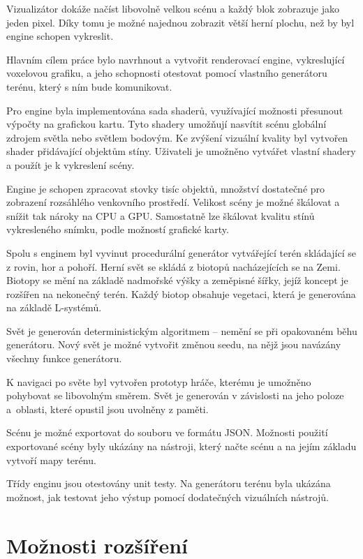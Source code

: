 \documentclass[thesis=M,czech]{FITthesis}[2019/12/23]
\begin{document}
Vizualizátor dokáže načíst libovolně velkou scénu a každý blok zobrazuje jako jeden pixel. Díky tomu je možné najednou zobrazit větší herní plochu, než by byl engine schopen vykreslit.



\begin{conclusion}
Hlavním cílem práce bylo navrhnout a vytvořit renderovací engine, vykreslující voxelovou grafiku, a jeho schopnosti otestovat pomocí vlastního generátoru terénu, který s ním bude komunikovat.

Pro engine byla implementována sada shaderů, využívající možnosti pře\-su\-nout výpočty na grafickou kartu. Tyto shadery umožňují nasvítit scénu globální zdrojem světla nebo světlem bodovým. Ke zvýšení vizuální kvality byl vytvořen shader přidávající objektům stíny. Uživateli je umožněno vytvářet vlastní shadery a použít je k vykreslení scény.

Engine je schopen zpracovat stovky tisíc objektů, množství dostatečné pro zobrazení rozsáhlého venkovního prostředí. Velikost scény je možné škálovat a snížit tak nároky na CPU a GPU. Samostatně lze škálovat kvalitu stínů vykresleného snímku, podle možností grafické karty.

Spolu s enginem byl vyvinut procedurální generátor vytvářející terén sklá\-da\-jí\-cí se z rovin, hor a pohoří. Herní svět se skládá z biotopů nacházejících se na Zemi. Biotopy se mění na základě nadmořské výšky a zeměpisné šířky, jejíž koncept je rozšířen na nekonečný terén. Každý biotop obsahuje vegetaci, která je generována na základě L-systémů.

Svět je generován deterministickým algoritmem -- nemění se při opakovaném běhu generátoru. Nový svět je možné vytvořit změnou seedu, na nějž jsou navázány všechny funkce generátoru.

K navigaci po světe byl vytvořen prototyp hráče, kterému je umožněno pohybovat se libovolným směrem. Svět je generován v závislosti na jeho poloze a~oblasti, které opustil jsou uvolněny z paměti. 

Scénu je možné exportovat do souboru ve formátu JSON. Možnosti použití exportované scény byly ukázány na nástroji, který načte scénu a na jejím základu vytvoří mapy terénu.

Třídy enginu jsou otestovány unit testy. Na generátoru terénu byla uká\-zá\-na možnost, jak testovat jeho výstup pomocí dodatečných vizuálních nástrojů.

\section{Možnosti rozšíření}

\end{conclusion}
\end{document}
